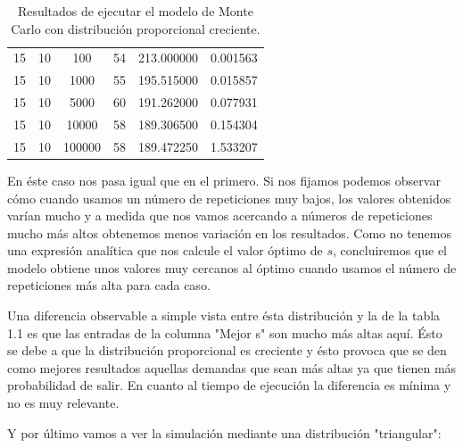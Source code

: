 \documentclass[11pt,a4paper]{report}
\begin{document}
\begin{table}[H]
{\begin{tabular}{|c|c|c|c|c|c|}
        15 & 10 & 100 & 54 & 213.000000 & 0.001563 \\ 
        15 & 10 & 1000 & 55 & 195.515000 & 0.015857 \\ 
        15 & 10 & 5000 & 60 & 191.262000 & 0.077931 \\ 
        15 & 10 & 10000 & 58 & 189.306500 & 0.154304 \\ 
        15 & 10 & 100000 & 58 & 189.472250 & 1.533207 \\ \hline
\end{tabular}
}%
\caption{Resultados de ejecutar el modelo de Monte Carlo con distribución proporcional creciente.}
\label{tabla2}
\end{table}

En éste caso nos pasa igual que en el primero. Si nos fijamos podemos observar cómo cuando usamos un número de repeticiones muy bajos, los valores obtenidos varían mucho y a medida que nos vamos acercando a números de repeticiones mucho más altos obtenemos menos variación en los resultados. Como no tenemos una expresión analítica que nos calcule el valor óptimo de $s$, concluiremos que el modelo obtiene unos valores muy cercanos al óptimo cuando usamos el número de repeticiones más alta para cada caso.

Una diferencia observable a simple vista entre ésta distribución y la de la tabla 1.1 es que las entradas de la columna "Mejor s" son mucho más altas aquí. Ésto se debe a que la distribución proporcional es creciente y ésto provoca que se den como mejores resultados aquellas demandas que sean más altas ya que tienen más probabilidad de salir. En cuanto al tiempo de ejecución la diferencia es mínima y no es muy relevante.


Y por último vamos a ver la simulación mediante una distribución "triangular":
\end{document}
